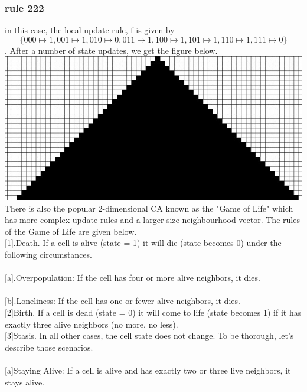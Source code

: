 \documentclass[24 pts]{article}
\begin{document}
\subsubsection{rule 222}
in this case, the local update rule, f is given by 
$$\{000\mapsto 1,001\mapsto 1,010\mapsto 0,011\mapsto 1,100\mapsto 1,101\mapsto 1,110\mapsto 1,111\mapsto 0\}$$. After a number of state updates, we get the figure below.\\ \includegraphics[scale =0.5]{Rule222}\\
There is also the popular 2-dimensional CA known as the "Game of Life" which has more complex update rules and a larger size neighbourhood vector.
The rules of the Game of Life are given below.\\


    [1].Death. If a cell is alive (state = 1) it will die (state becomes 0) under the following circumstances.
\paragraph{}
        [a].Overpopulation: If the cell has four or more alive neighbors, it dies.
\paragraph{}
        [b].Loneliness: If the cell has one or fewer alive neighbors, it dies.\\

    [2]Birth. If a cell is dead (state = 0) it will come to life (state becomes 1) if it has exactly three alive neighbors (no more, no less).\\

    [3]Stasis. In all other cases, the cell state does not change. To be thorough, let’s describe those scenarios.
\paragraph{}
        [a]Staying Alive: If a cell is alive and has exactly two or three live neighbors, it stays alive.
\end{document}
